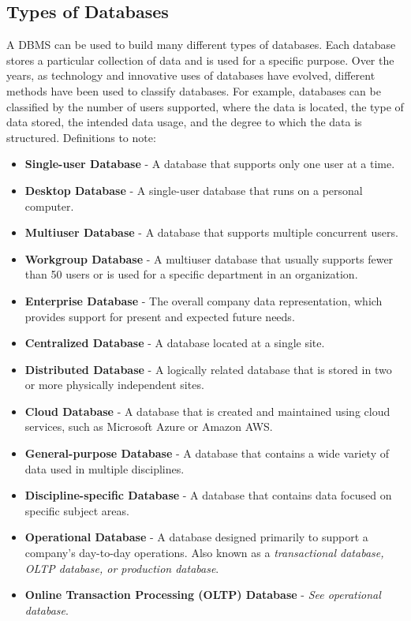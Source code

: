 \documentclass[a4paper, 12pt, titlepage]{report}
\begin{document}
\subsection{Types of Databases}
A DBMS can be used to build many different types of databases. Each database stores a
particular collection of data and is used for a specific purpose. Over the years, as technology and innovative uses of databases have evolved, different methods have been used
to classify databases. For example, databases can be classified by the number of users
supported, where the data is located, the type of data stored, the intended data usage,
and the degree to which the data is structured.
Definitions to note:
\begin{itemize}
\item \textbf{Single-user Database} - A database that supports only one user at a time.
\item \textbf{Desktop Database} - A single-user database that runs on a personal computer.
\item \textbf{Multiuser Database} - A database that supports multiple concurrent users.
\item \textbf{Workgroup Database} - A multiuser database that usually supports fewer than 50 users or is used for a specific department in an organization.
\item \textbf{Enterprise Database} - The overall company data representation, which provides support for present and expected future needs.
\item \textbf{Centralized Database} - A database located at a single site.
\item \textbf{Distributed Database} - A logically related database that is stored in two or more physically independent sites.
\item \textbf{Cloud Database} - A database that is created and maintained using cloud services, such as Microsoft Azure or Amazon AWS.
\item \textbf{General-purpose Database} - A database that contains a wide variety of data used in multiple disciplines.
\item \textbf{Discipline-specific Database} - A database that contains data focused on specific subject areas.
\item \textbf{Operational Database} - A database designed primarily to support a company’s day-to-day operations. Also known as a \emph{transactional database, OLTP database, or production database}.
\item \textbf{Online Transaction Processing (OLTP) Database} - \emph{See operational database}.

\end{itemize}
\end{document}

